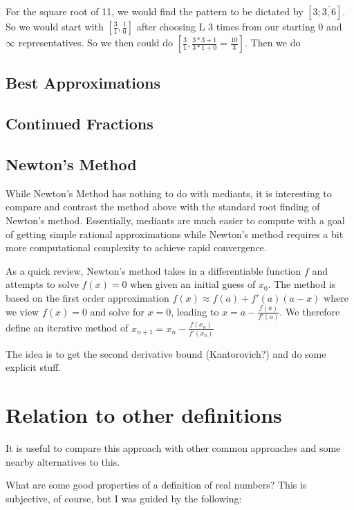 \documentclass[12pt]{article}
\theoremstyle{remark}
\begin{document}
For the square root of 11, we would find the pattern to be dictated by $[3;\overline{3,6}]$. So we would start with $[\tfrac{3}{1}, \tfrac{1}{0}]$ after choosing L 3 times from our starting 0 and $\infty$ representatives. So we then could do $[\tfrac{3}{1}, \tfrac{3*3 + 1}{3*1 + 0} = \tfrac{10}{3}]$. Then we do 


\subsection{Best Approximations}

\subsection{Continued Fractions}


\subsection{Newton's Method}

While Newton's Method has nothing to do with mediants, it is interesting to compare and contrast the method above with the standard root finding of Newton's method. Essentially, mediants are much easier to compute with a goal of getting simple rational approximations while Newton's method requires a bit more computational complexity to achieve rapid convergence. 

As a quick review, Newton's method takes in a differentiable function $f$ and attempts to solve $f(x)= 0$ when given an initial guess of $x_0$. The method is based on the first order approximation $f(x) \approx f(a) + f'(a) (a-x) $ where we view $f(x) =0$ and solve for $x =0$, leading to $x = a - \tfrac{f(a)}{f'(a)}$. We therefore define an iterative method of $x_{n+1} = x_n - \tfrac{f(x_n)}{f'(x_n)}$



The idea is to get the second derivative bound (Kantorovich?) and do some explicit stuff. 


\section{Relation to other definitions}

It is useful to compare this approach with other common approaches and some nearby alternatives to this. 

What are some good properties of a definition of real numbers? This is subjective, of course, but I was guided by the following: 
\end{document}
